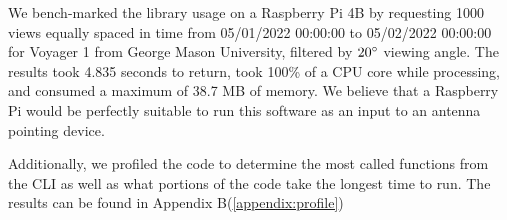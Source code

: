 \documentclass[../main.tex]{subfiles}
\begin{document}
We bench-marked the library usage on a Raspberry Pi 4B by requesting 1000 views equally spaced in time from 05/01/2022 00:00:00 to 05/02/2022 00:00:00 for Voyager 1 from George Mason University, filtered by \(20\degree\) viewing angle. The results took 4.835 seconds to return, took 100\% of a CPU core while processing, and consumed a maximum of 38.7 MB of memory. We believe that a Raspberry Pi would be perfectly suitable to run this software as an input to an antenna pointing device.

Additionally, we profiled the code to determine the most called functions from the CLI as well as what portions of the code take the longest time to run. The results can be found in Appendix B(\ref{appendix:profile})
\end{document}
